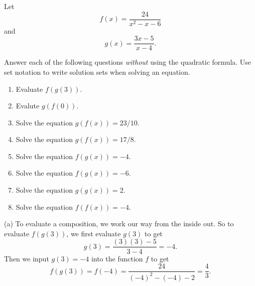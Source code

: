 \documentclass{ximera}
\begin{document}
\begin{example}  \label{Ex0:Comp}
Let
\[
    f(x) = \frac{24}{x^2-x-6}
\]
and 
\[
    g(x) = \frac{3x-5}{x-4} .
\]


Answer each of the following questions \emph{without} using the quadratic formula. Use set notation to write solution sets when solving an equation.
\begin{enumerate}
\item Evaluate $f(g(3))$.

\item Evalute $g(f(0))$.

\item Solve the equation $g(f(x))=23/10$.

\item Solve the equation $g(f(x)) = 17/8$.

\item Solve the equation $f(g(x)) = -4$.

\item Solve the equation $f(g(x)) = -6$.

\item Solve the equation $g(g(x)) = 2$.

\item Solve the equation $f(f(x)) = -4$.
\end{enumerate}


\begin{explanation}
(a) To evaluate a composition, we work our way from the inside out. So to evaluate $f(g(3))$, we first evaluate $g(3)$ to get
\[
    g(3) = \frac{(3)(3)-5}{3-4} = -4 .
\]
Then we input $g(3) = -4$ into the function $f$ to get
\[
   f(g(3)) = f(-4) = \frac{24}{(-4)^2 - (-4) -2} = \frac{4}{3} .
\]


\end{explanation}

\end{example}
\end{document}
